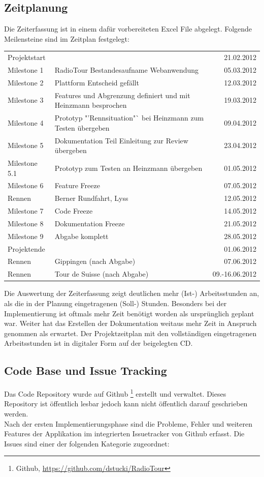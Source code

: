 \subsection{Zeitplanung}
Die Zeiterfassung ist in einem dafür vorbereiteten Excel File abgelegt. Folgende Meilensteine sind im Zeitplan festgelegt:

\begin{tabular}{p{2.1cm}p{7.5cm}r}
Projektstart & & 21.02.2012\\
Milestone 1 & RadioTour Bestandesaufname Webanwendung & 05.03.2012\\
Milestone 2 & Plattform Entscheid gefällt & 12.03.2012\\
Milestone 3 & Features und Abgrenzung definiert und mit Heinzmann besprochen & 19.03.2012\\
Milestone 4 & Prototyp "'Rennsituation"` bei Heinzmann zum Testen übergeben & 09.04.2012\\
Milestone 5 & Dokumentation Teil Einleitung zur Review übergeben & 23.04.2012\\
Milestone 5.1 & Prototyp zum Testen an Heinzmann übergeben & 01.05.2012\\
Milestone 6 & Feature Freeze & 07.05.2012\\
Rennen & Berner Rundfahrt, Lyss & 12.05.2012\\
Milestone 7 & Code Freeze & 14.05.2012\\
Milestone 8 & Dokumentation Freeze & 21.05.2012\\
Milestone 9 & Abgabe komplett & 28.05.2012\\
Projektende & & 01.06.2012\\
Rennen & Gippingen (nach Abgabe) & 07.06.2012\\
Rennen & Tour de Suisse (nach Abgabe) & 09.-16.06.2012\\
\end{tabular}

Die Auswertung der Zeiterfassung zeigt deutlichen mehr  (Ist-) Arbeitsstunden an, als die in der Planung eingetragenen (Soll-) Stunden. Besonders bei der Implementierung ist oftmals mehr Zeit benötigt worden als ursprünglich geplant war. Weiter hat das Erstellen der Dokumentation weitaus mehr Zeit in Anspruch genommen als erwartet. Der Projektzeitplan mit den vollständigen eingetragenen Arbeitsstunden ist in digitaler Form auf der beigelegten CD.

\subsection{Code Base und Issue Tracking}
Das Code Repository wurde auf Github \footnote{Github, \url{https://github.com/dstucki/RadioTour}} erstellt und verwaltet. Dieses Repository ist öffentlich lesbar jedoch kann nicht öffentlich darauf geschrieben werden.
\\
Nach der ersten Implementierungsphase sind die Probleme, Fehler und weiteren Features der Applikation im integrierten Issuetracker von Github erfasst. Die Issues sind einer der folgenden Kategorie zugeordnet:

